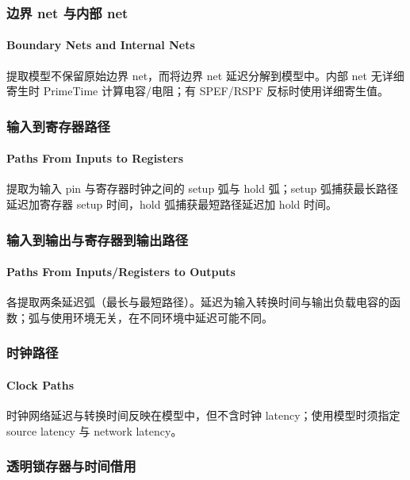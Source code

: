 \subsubsection{边界 net 与内部 net}
\paragraph*{Boundary Nets and Internal Nets}

提取模型不保留原始边界 net，而将边界 net 延迟分解到模型中。内部 net 无详细寄生时 PrimeTime 计算电容/电阻；有 SPEF/RSPF 反标时使用详细寄生值。

\subsubsection{输入到寄存器路径}
\paragraph*{Paths From Inputs to Registers}

提取为输入 pin 与寄存器时钟之间的 setup 弧与 hold 弧；setup 弧捕获最长路径延迟加寄存器 setup 时间，hold 弧捕获最短路径延迟加 hold 时间。

\subsubsection{输入到输出与寄存器到输出路径}
\paragraph*{Paths From Inputs/Registers to Outputs}

各提取两条延迟弧（最长与最短路径）。延迟为输入转换时间与输出负载电容的函数；弧与使用环境无关，在不同环境中延迟可能不同。

\subsubsection{时钟路径}
\paragraph*{Clock Paths}

时钟网络延迟与转换时间反映在模型中，但不含时钟 latency；使用模型时须指定 source latency 与 network latency。

\subsubsection{透明锁存器与时间借用}
